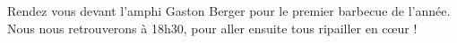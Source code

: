 Rendez vous devant l'amphi Gaston Berger pour le premier barbecue de l'année.
Nous nous retrouverons à 18h30, pour aller ensuite tous ripailler en cœur !
